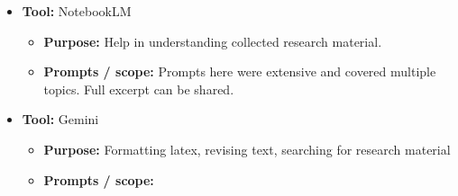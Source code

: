 \documentclass[11pt,a4paper]{article}
\begin{document}
\begin{itemize}
    \item \textbf{Tool:} NotebookLM \begin{itemize}
        \item \textbf{Purpose:} Help in understanding collected research material.
        \item \textbf{Prompts / scope:} Prompts here were extensive and covered multiple topics. Full excerpt can be shared.
    \end{itemize}
    \item \textbf{Tool:} Gemini \begin{itemize}
        \item \textbf{Purpose:} Formatting latex, revising text, searching for research material
        \item \textbf{Prompts / scope:} 
    \end{itemize}
\end{itemize}

%
%


\end{document}
